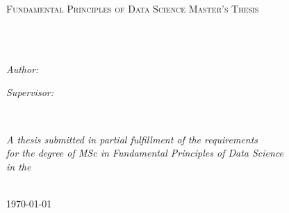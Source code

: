\documentclass[
11pt, %
english, %
onehalfspacing, %
headsepline, %
]{MastersDoctoralThesis} %
\author{Zoltan Kunos} %
\begin{document}
\frontmatter %

\pagestyle{plain} %


\begin{titlepage}
\begin{center}

\vspace*{.06\textheight}
{\scshape\LARGE \univname\par}\vspace{1.5cm} %
\textsc{\Large Fundamental Principles of Data Science Master's Thesis}\\[0.5cm] %

\HRule \\[0.4cm] %
{\huge \bfseries \ttitle\par}\vspace{0.4cm} %
\HRule \\[1.5cm] %
 
\begin{minipage}[t]{0.4\textwidth}
\begin{flushleft} \large
\emph{Author:}\\
\href{http://www.johnsmith.com}{\authorname} %
\end{flushleft}
\end{minipage}
\begin{minipage}[t]{0.4\textwidth}
\begin{flushright} \large
\emph{Supervisor:} \\
\href{http://www.jamessmith.com}{\supname} %
\end{flushright}
\end{minipage}\\[3cm]
 
\vfill

\large \textit{A thesis submitted in partial fulfillment of the requirements\\ for the degree of MSc in Fundamental Principles of Data Science}\\[0.3cm] %
\textit{in the}\\[0.4cm]
\facname\\[2cm] %
 
\vfill

{\large \today}\\[4cm] %
 
\vfill
\end{center}
\end{titlepage}
\end{document}
